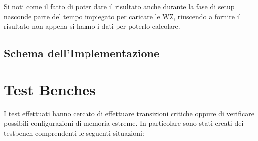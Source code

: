 \documentclass{article}
\begin{document}
\newpage

Si noti come il fatto di poter dare il risultato anche durante la fase di setup nasconde parte del tempo impiegato per caricare le WZ, riuscendo a fornire il risultato non appena si hanno i dati per poterlo calcolare.

\subsection{Schema dell'Implementazione}
\label{schema}

\vspace*{1cm}

\noindent
{}%

\vspace*{1cm}




\section{Test Benches}
\label{test}

I test effettuati hanno cercato di effettuare transizioni critiche oppure di verificare possibili configurazioni di memoria estreme. In particolare sono stati creati dei testbench
comprendenti le seguenti situazioni:
\end{document}
